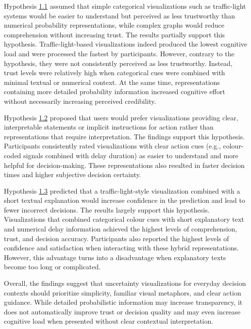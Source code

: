 \documentclass[final,journal,a4paper]{IEEEtran}
\begin{document}
Hypothesis \hyperlink{h:1.1}{1.1} assumed that simple categorical visualizations such as traffic-light systems would be easier to understand but perceived as less trustworthy than numerical probability representations, while complex graphs would reduce comprehension without increasing trust.
The results partially support this hypothesis. Traffic-light-based visualizations indeed produced the lowest cognitive load and were processed the fastest by participants. However, contrary to the hypothesis, they were not consistently perceived as less trustworthy. Instead, trust levels were relatively high when categorical cues were combined with minimal textual or numerical context. At the same time, representations containing more detailed probability information increased cognitive effort without necessarily increasing perceived credibility.

Hypothesis \hyperlink{h:1.2}{1.2} proposed that users would prefer visualizations providing clear, interpretable statements or implicit instructions for action rather than representations that require interpretation.
The findings support this hypothesis. Participants consistently rated visualizations with clear action cues (e.g., colour-coded signals combined with delay duration) as easier to understand and more helpful for decision-making. These representations also resulted in faster decision times and higher subjective decision certainty.

Hypothesis \hyperlink{h:1.3}{1.3} predicted that a traffic-light-style visualization combined with a short textual explanation would increase confidence in the prediction and lead to fewer incorrect decisions.
The results largely support this hypothesis. Visualizations that combined categorical colour cues with short explanatory text and numerical delay information achieved the highest levels of comprehension, trust, and decision accuracy. Participants also reported the highest levels of confidence and satisfaction when interacting with these hybrid representations. However, this advantage turns into a disadvantage when explanatory texts become too long or complicated.

Overall, the findings suggest that uncertainty visualizations for everyday decision contexts should prioritize simplicity, familiar visual metaphors, and clear action guidance. While detailed probabilistic information may increase transparency, it does not automatically improve trust or decision quality and may even increase cognitive load when presented without clear contextual interpretation.
\end{document}
